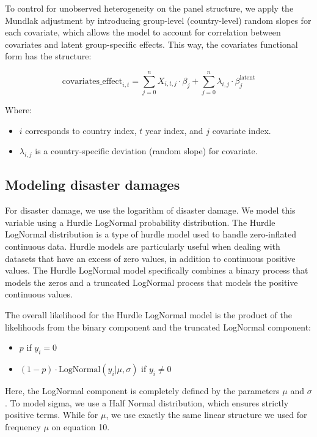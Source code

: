 To control for unobserved heterogeneity on the panel structure, we apply the Mundlak adjustment by introducing group-level (country-level) random slopes for each covariate, which allows the model to account for correlation between covariates and latent group-specific effects. This way, the covariates functional form has the structure:

\begin{equation}
\text{covariates\_effect}_{i,t} = \sum_{j=0}^{n} X_{i,t,j} \cdot \beta_j + \sum_{j=0}^{n} \lambda_{i,j} \cdot \beta_j^{\text{latent}}
\end{equation}

Where:
\begin{itemize}
    \item $i$ corresponds to country index, $t$ year index, and $j$ covariate index.
    \item $\lambda_{i,j}$ is a country-specific deviation (random slope) for covariate.
\end{itemize}

\subsection{Modeling disaster damages}

For disaster damage, we use the logarithm of disaster damage. We model this variable using a Hurdle LogNormal probability distribution. The Hurdle LogNormal distribution is a type of hurdle model used to handle zero-inflated continuous data. Hurdle models are particularly useful when dealing with datasets that have an excess of zero values, in addition to continuous positive values. The Hurdle LogNormal model specifically combines a binary process that models the zeros and a truncated LogNormal process that models the positive continuous values.

The overall likelihood for the Hurdle LogNormal model is the product of the likelihoods from the binary component and the truncated LogNormal component:

\begin{itemize}
    \item $p$ if $y_i = 0$
    \item $(1-p) \cdot \text{LogNormal}(y_i|\mu, \sigma)$ if $y_i \neq 0$
\end{itemize}

Here, the LogNormal component is completely defined by the parameters $\mu$ and $\sigma$. To model sigma, we use a Half Normal distribution, which ensures strictly positive terms. While for $\mu$, we use exactly the same linear structure we used for frequency $\mu$ on equation 10.

